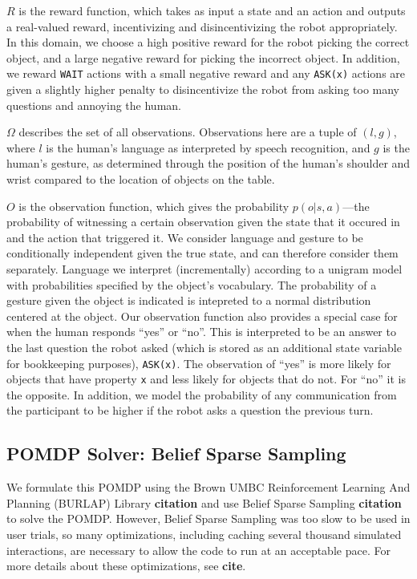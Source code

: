 \documentclass{article}
\begin{document}
$R$ is the reward function, which takes as input a state and an action and outputs a real-valued reward, incentivizing and disincentivizing the robot appropriately. In this domain, we choose a high positive reward for the robot picking the correct object, and a large negative reward for picking the incorrect object. In addition, we reward \texttt{WAIT} actions with a small negative reward and any \texttt{ASK(x)} actions are given a slightly higher penalty to disincentivize the robot from asking too many questions and annoying the human. 

$\Omega$ describes the set of all observations. Observations here are a tuple of $(l,g)$, where $l$ is the human's language as interpreted by speech recognition, and $g$ is the human's gesture, as determined through the position of the human's shoulder and wrist compared to the location of objects on the table. 

$O$ is the observation function, which gives the probability $p(o|s, a)$---the probability of witnessing a certain observation given the state that it occured in and the action that triggered it. We consider language and gesture to be conditionally independent given the true state, and can therefore consider them separately. Language we interpret (incrementally) according to a unigram model with probabilities specified by the object's vocabulary. The probability of a gesture given the object is indicated is intepreted to a normal distribution centered at the object. Our observation function also provides a special case for when the human responds ``yes'' or ``no''. This is interpreted to be an answer to the last question the robot asked (which is stored as an additional state variable for bookkeeping purposes), \texttt{ASK(x)}. The observation of ``yes'' is more likely for objects that have property \texttt{x} and less likely for objects that do not. For ``no'' it is the opposite. In addition, we model the probability of any communication from the participant to be higher if the robot asks a question the previous turn. 

\subsection{POMDP Solver: Belief Sparse Sampling}

We formulate this POMDP using the Brown UMBC Reinforcement Learning And Planning (BURLAP) Library \textbf{citation} and use Belief Sparse Sampling \textbf{citation} to solve the POMDP. However, Belief Sparse Sampling was too slow to be used in user trials, so many optimizations, including caching several thousand simulated interactions, are necessary to allow the code to run at an acceptable pace. For more details about these optimizations, see \textbf{cite}. 
\end{document}
